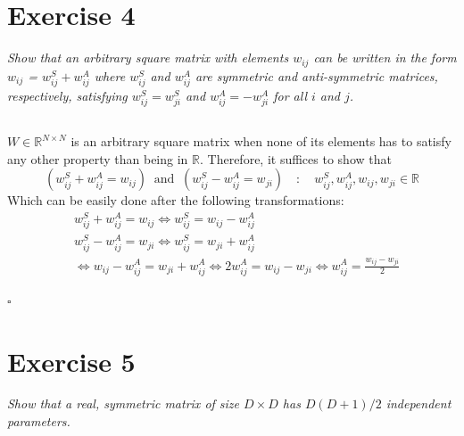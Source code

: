\documentclass[11pt]{scrartcl} %
\begin{document}
	\vspace{5mm}
        \section*{Exercise 4}
        {\it Show that an arbitrary square matrix with elements \(w_{ij}\) can be written in the form \(w_{ij}\) = \(w_{ij}^S+w_{ij}^A\) where \(w_{ij}^S\) and \(w_{ij}^A\) are symmetric and anti-symmetric matrices, respectively, satisfying \(w_{ij}^S=w_{ji}^S\) and \(w_{ij}^A=-w_{ji}^A\) for all \(i\) and \(j\).}
        \subsection*{}
        \(W \in \mathbb{R}^{N\times N}\) is an arbitrary square matrix when none of its elements has to satisfy any other property than being in \(\mathbb{R}\). Therefore, it suffices to show that 
        \begin{equation}\label{eq:20}
            (w_{ij}^S+w_{ij}^A = w_{ij}) \;\;\text{and}\;\; (w_{ij}^S-w_{ij}^A = w_{ji}) \quad : \quad w_{ij}^S,w_{ij}^A,w_{ij},w_{ji} \in \mathbb{R}
        \end{equation}
        Which can be easily done after the following transformations:
        \begin{equation*}
          \begin{split}
            &w_{ij}^S+w_{ij}^A = w_{ij} \iff w_{ij}^S = w_{ij}-w_{ij}^A\\
            &w_{ij}^S-w_{ij}^A = w_{ji} \iff w_{ij}^S = w_{ji}+w_{ij}^A\\
            &\iff w_{ij}-w_{ij}^A = w_{ji}+w_{ij}^A \iff 2w_{ij}^A = w_{ij}-w_{ji} \iff w_{ij}^A = \frac{w_{ij}-w_{ji}}{2}
          \end{split}
        \end{equation*}
        \begin{flushright}
          $\square$\\
        \end{flushright}


\vspace{5mm}
\section*{Exercise 5}
{\it Show that a real, symmetric matrix of size \(D\times D\) has \(D(D+1)/2\) independent parameters.}
\end{document}
